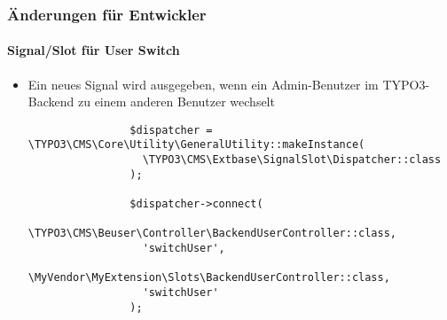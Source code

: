 \begin{frame}[fragile]
	\frametitle{Änderungen für Entwickler}
	\framesubtitle{Signal/Slot für User Switch}

	\lstset{basicstyle=\tiny\ttfamily}

	\begin{itemize}
		\item Ein neues Signal wird ausgegeben, wenn ein Admin-Benutzer im TYPO3-Backend zu einem
			anderen Benutzer wechselt

			\begin{lstlisting}
				$dispatcher = \TYPO3\CMS\Core\Utility\GeneralUtility::makeInstance(
				  \TYPO3\CMS\Extbase\SignalSlot\Dispatcher::class
				);

				$dispatcher->connect(
				  \TYPO3\CMS\Beuser\Controller\BackendUserController::class,
				  'switchUser',
				  \MyVendor\MyExtension\Slots\BackendUserController::class,
				  'switchUser'
				);
			\end{lstlisting}

	\end{itemize}

\end{frame}


